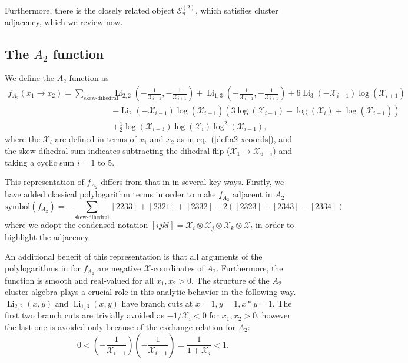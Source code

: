 \documentclass[11pt]{article}
\DeclareMathOperator{\Li}{Li}
\def\x{\mathcal{X}}
\def\xcoords{$\mathcal{X}$-coordinates }
\def\pdfeq#1{\texorpdfstring{$#1$}{a}}
\begin{document}
Furthermore, there is the closely related object $\mathcal{E}^{(2)}_n$, which satisfies cluster adjacency, which we review now.

\subsection{The \pdfeq{A_2} function}
We define the $A_2$ function as
\begin{equation}\label{def:a2-function}
\begin{split}
	f_{A_2}(x_1 \to x_2)  = \sum_{\text{skew-dihedral}} &\Li_{2,2}\left(-\frac{1}{\x_{i-1}},-\frac{1}{\x_{i+1}}\right) + \Li_{1,3}\left(-\frac{1}{\x_{i-1}},-\frac{1}{\x_{i+1}}\right)+6 \Li_3\left(-\x_{i-1}\right) \log \left(\x_{i+1}\right)
	\\&-\Li_2\left(-\x_{i-1}\right) \log \left(\x_{i+1}\right) \left(3 \log \left(\x_{i-1}\right)-\log \left(\x_i\right)+\log \left(\x_{i+1}\right)\right)
	\\&+\frac{1}{2} \log \left(\x_{i-3}\right) \log \left(\x_i\right) \log ^2\left(\x_{i-1}\right),
\end{split}
\end{equation}
where the $\x_i$ are defined in terms of $x_1$ and $x_2$ as in eq.~(\ref{def:a2-xcoords}), and the skew-dihedral sum indicates subtracting the dihedral flip ($\x_1 \to \x_{6-i}$) and taking a cyclic sum $i=1$ to $5$.

This representation of $f_{A_2}$ differs from that in \cite{Golden:2014xqa} in several key ways. Firstly, we have added classical polylogarithm terms in order to make $f_{A_2}$ adjacent in $A_2$:
\begin{equation}
   \text{symbol}(f_{A_2}) = -\sum_{\text{skew-dihedral}}[2233]+[2321]+[2332]-2([2323]+[2343]-[2334])
\end{equation}
where we adopt the condensed notation $[ijkl] = \x_i\otimes\x_j\otimes\x_k\otimes\x_l$ in order to highlight the adjacency. 

An additional benefit of this representation is that all arguments of the polylogarithms in for $f_{A_2}$ are negative \xcoords of $A_2$. Furthermore, the function is smooth and real-valued for all $x_1, x_2>0$. The structure of the $A_2$ cluster algebra plays a crucial role in this analytic behavior in the following way. $\Li_{2,2}(x,y)$ and $\Li_{1,3}(x,y)$ have branch cuts at $x=1,y=1, x*y=1$. The first two branch cuts are trivially avoided as $-1/\x_i<0$ for $x_1,x_2>0$, however the last one is avoided only because of the exchange relation for $A_2$: 
\begin{equation}
	0<\left(-\frac{1}{\x_{i-1}}\right)\left(-\frac{1}{\x_{i+1}}\right) = \frac{1}{1+\x_i}<1.
\end{equation}
\end{document}
